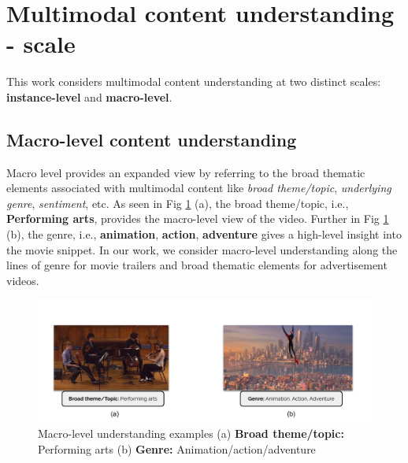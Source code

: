 \section{Multimodal content understanding - scale}
This work considers multimodal content understanding at two distinct scales: \textbf{instance-level} and \textbf{macro-level}. 
\subsection{Macro-level content understanding}
Macro level provides an expanded view by referring to the broad thematic elements associated with multimodal content like \textit{broad theme/topic}, \textit{underlying genre}, \textit{sentiment}, etc. As seen in Fig \ref{macro_scale_understanding} (a), the broad theme/topic, i.e., \textbf{Performing arts}, provides the macro-level view of the video. Further in Fig  \ref{macro_scale_understanding} (b), the genre, i.e., \textbf{animation}, \textbf{action}, \textbf{adventure} gives a high-level insight into the movie snippet. In our work, we consider macro-level understanding along the lines of genre for movie trailers and broad thematic elements for advertisement videos. 
\begin{figure}
 \centering
    \includegraphics[width=\textwidth]{figures/macro_scale_understanding.pdf}
    \caption{Macro-level understanding examples (a) \textbf{Broad theme/topic:} Performing arts (b) \textbf{Genre:} Animation/action/adventure}
    \label{macro_scale_understanding}
\end{figure}
